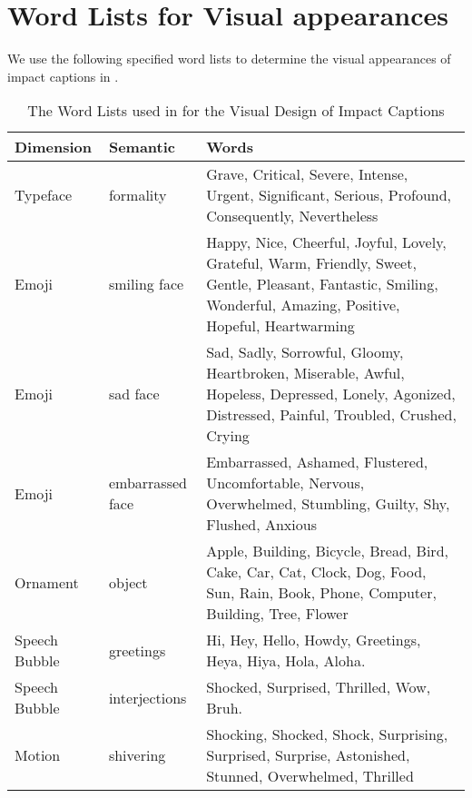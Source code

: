 

\section{Word Lists for Visual appearances}
\label{sec_appendix_words}

We use the following specified word lists to determine the visual appearances of impact captions in \system{}. 

\begin{table*}[hbt]
  \caption{The Word Lists used in \system{} for the Visual Design of Impact Captions}
  \label{tab:word_lists}
  \begin{tabular}{p{1.5cm}p{2cm}p{9cm}}
    \toprule
        Dimension & Semantic & Words  \\
    \midrule
        Typeface & formality & Grave, Critical, Severe, Intense, Urgent, Significant, Serious, Profound, Consequently, Nevertheless \\

        Emoji & smiling face & Happy, Nice, Cheerful, Joyful, Lovely, Grateful, Warm, Friendly, Sweet, Gentle, Pleasant, Fantastic, Smiling, Wonderful, Amazing, Positive, Hopeful, Heartwarming \\

        Emoji & sad face & Sad, Sadly, Sorrowful, Gloomy, Heartbroken, Miserable, Awful, Hopeless, Depressed, Lonely, Agonized, Distressed, Painful, Troubled, Crushed, Crying \\

        Emoji & embarrassed face & Embarrassed, Ashamed, Flustered, Uncomfortable, Nervous, Overwhelmed, Stumbling, Guilty, Shy, Flushed, Anxious \\

        Ornament & object & Apple, Building, Bicycle, Bread, Bird, Cake, Car, Cat, Clock, Dog, Food, Sun, Rain, Book, Phone, Computer, Building, Tree, Flower \\

        Speech Bubble & greetings & Hi, Hey, Hello, Howdy, Greetings, Heya, Hiya, Hola, Aloha. \\

        Speech Bubble & interjections & Shocked, Surprised, Thrilled, Wow, Bruh.  \\

        Motion & shivering & Shocking, Shocked, Shock, Surprising, Surprised, Surprise, Astonished, Stunned, Overwhelmed, Thrilled \\
    \bottomrule
\end{tabular}
\end{table*}

